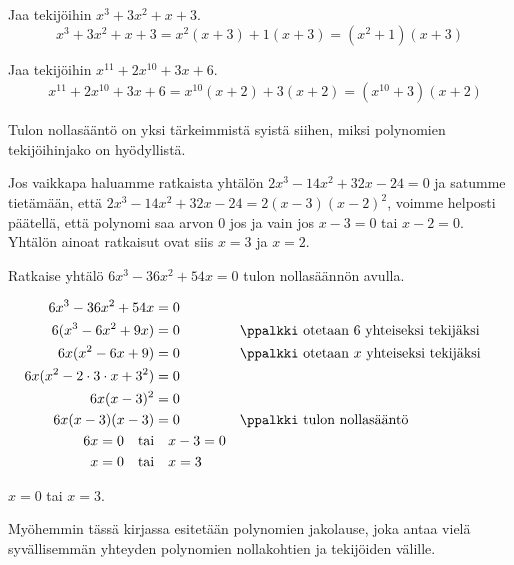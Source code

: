 \begin{esimerkki}
Jaa tekijöihin $x^3+3x^2+x+3$.
\begin{equation*}
x^3+3x^2+x+3=x^2(x+3)+1(x+3)=(x^2+1)(x+3)
\end{equation*}
\end{esimerkki}

\begin{esimerkki}
Jaa tekijöihin $x^{11}+2x^{10}+3x+6$.
\begin{align*}
& x^{11}+2x^{10}+3x+6=x^{10}(x+2)+3(x+2)=(x^{10}+3)(x+2)
\end{align*}
\end{esimerkki}

Tulon nollasääntö on yksi tärkeimmistä syistä siihen, miksi polynomien tekijöihinjako on hyödyllistä.

Jos vaikkapa haluamme ratkaista yhtälön $2x^3-14x^2+32x-24=0$ ja satumme tietämään, että $2x^3-14x^2+32x-24=2(x-3)(x-2)^2$,
voimme helposti päätellä, että polynomi saa arvon $0$ jos ja vain jos $x-3=0$ tai $x-2=0$. Yhtälön ainoat ratkaisut ovat siis $x=3$ ja $x=2$.

\begin{esimerkki}
Ratkaise yhtälö $6x^3-36x^2+54x=0$ tulon nollasäännön avulla.
\begin{esimratk}
\begin{align*}
6x^3-36x^2+54x &= 0 \\
6(x^3-6x^2+9x) &= 0 && \ppalkki \text{ otetaan } 6 \text{ yhteiseksi tekijäksi} \\
6x(x^2-6x+9) &= 0 && \ppalkki \text{ otetaan } x \text{ yhteiseksi tekijäksi} \\
6x(x^2-2\cdot 3\cdot x+3^2)  &= 0 \\
6x(x-3)^2 &= 0 & \\
6x(x-3)(x-3) &= 0 && \ppalkki \text{ tulon nollasääntö}\\
6x=0 \textrm{\quad tai}& \quad x-3=0 \\
x=0 \textrm{\quad tai}& \quad x=3 \\
\end{align*}
\end{esimratk}
\begin{esimvast}
$x=0$ tai $x=3$.
\end{esimvast}
\end{esimerkki}

Myöhemmin tässä kirjassa esitetään polynomien jakolause, joka antaa vielä syvällisemmän yhteyden polynomien nollakohtien ja tekijöiden välille.


